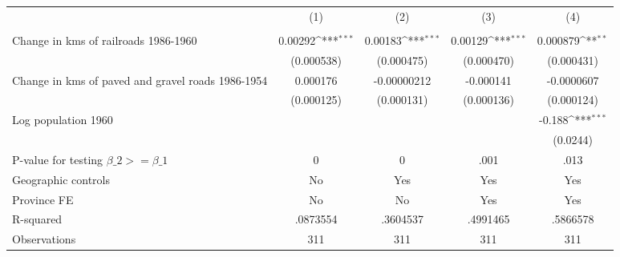 {
\def\sym#1{\ifmmode^{#1}\else\(^{#1}\)\fi}
\begin{tabular}{l*{4}{c}}
\hline\hline
                &\multicolumn{1}{c}{(1)}&\multicolumn{1}{c}{(2)}&\multicolumn{1}{c}{(3)}&\multicolumn{1}{c}{(4)}\\
                &\multicolumn{1}{c}{}&\multicolumn{1}{c}{}&\multicolumn{1}{c}{}&\multicolumn{1}{c}{}\\
\hline
Change in kms of railroads 1986-1960&  0.00292\sym{***}&  0.00183\sym{***}&  0.00129\sym{***}& 0.000879\sym{**} \\
                &(0.000538)         &(0.000475)         &(0.000470)         &(0.000431)         \\
[1em]
Change in kms of paved and gravel roads 1986-1954& 0.000176         &-0.00000212         &-0.000141         &-0.0000607         \\
                &(0.000125)         &(0.000131)         &(0.000136)         &(0.000124)         \\
[1em]
Log population 1960&                  &                  &                  &   -0.188\sym{***}\\
                &                  &                  &                  & (0.0244)         \\
\hline
P-value for testing $\beta\_{2} >= \beta\_{1}$&        0         &        0         &     .001         &     .013         \\
Geographic controls&       No         &      Yes         &      Yes         &      Yes         \\
Province FE     &       No         &       No         &      Yes         &      Yes         \\
R-squared       & .0873554         & .3604537         & .4991465         & .5866578         \\
Observations    &      311         &      311         &      311         &      311         \\
\hline\hline
\end{tabular}
}
